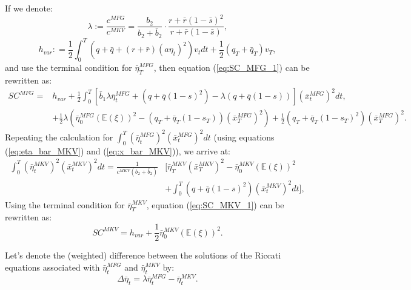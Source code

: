 \documentclass[11pt]{article}
\begin{document}
If we denote:
\begin{equation*}
\lambda := \frac{c^{MFG}}{c^{MKV}} = \frac{b_2}{b_2 + \bar{b}_2}\cdot \frac{ r + \bar{r}(1-\bar{s})^2 }{r + \bar{r}(1-\bar{s})},
\end{equation*}
\begin{equation*}
h_{var}: = \frac{1}{2}\int_0^T (q+\bar{q}+(r+\bar{r})(a\eta_t)^2)v_tdt + \frac{1}{2}(q_T+\bar{q}_T)v_T,
\end{equation*}
and use the terminal condition for $\bar{\eta}^{MFG}_T$, then equation (\ref{eq:SC_MFG_1}) can be rewritten as:
\begin{equation}
\begin{split}
SC^{MFG} = & h_{var} +  \frac{1}{2} \int_0^T \left[ \bar{b}_1 \lambda \bar{\eta}_t^{MFG} + (q+ \bar{q}(1-s)^2) - \lambda (q + \bar{q}(1-s)) \right] (\bar{x}_t^{MFG})^2 dt, \\
& + \frac{1}{2} \lambda \left( \bar{\eta}^{MFG}_0 (\mathbb{E}(\xi))^2 - (q_T+\bar{q}_T(1-s_T)) (\bar{x}_T^{MFG})^2 \right) + \frac{1}{2} (q_T+\bar{q}_T(1-s_T)^2)(\bar{x}_T^{MFG})^2.
\end{split}
\label{eq:SC_MFG_2}
\end{equation}
Repeating the calculation for $\int_0^T (\bar{\eta}^{MFG}_t)^2 (\bar{x}^{MFG}_t)^2 dt$ (using equations (\ref{eq:eta_bar_MKV}) and (\ref{eq:x_bar_MKV})), we arrive at:
\begin{equation*}
\begin{split}
\int_0^T (\bar{\eta}^{MKV}_t)^2 (\bar{x}^{MKV}_t)^2 dt=\frac{1}{c^{MKV}(b_2 + \bar{b}_2)} &\Bigg[ \bar{\eta}^{MKV}_T (\bar{x}^{MKV}_T)^2 - \bar{\eta}^{MKV}_0 (\mathbb{E}(\xi))^2 \\
&+ \int_0^T (q+\bar{q}(1-s)^2) (\bar{x}^{MKV}_t)^2 dt \Bigg],
\end{split}
\end{equation*}
Using the terminal condition for $\bar{\eta}^{MKV}_T$, equation (\ref{eq:SC_MKV_1}) can be rewritten as:
\begin{equation}
SC^{MKV} = h_{var} + \frac{1}{2} \bar{\eta}^{MKV}_0 (\mathbb{E}(\xi))^2.
\label{eq:SC_MKV_2}
\end{equation}

Let's denote the (weighted) difference between the solutions of the Riccati equations associated with $\bar{\eta}_t^{MFG}$ and $\bar{\eta}_t^{MKV}$ by:
\begin{equation}
	\Delta \bar{\eta}_t = \lambda \bar{\eta}_t^{MFG} - \bar{\eta}_t^{MKV} .
\label{eq:delta_eta}
\end{equation} 
\end{document}
